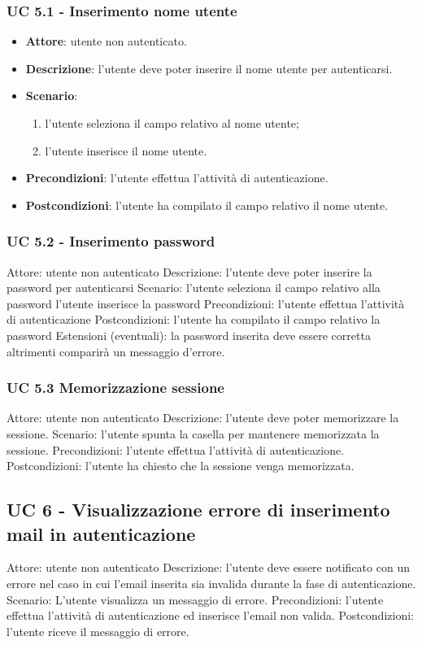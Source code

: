 \subsubsection{UC 5.1 - Inserimento nome utente}
\begin{itemize}
    \item \textbf{Attore}: utente non autenticato.
    \item \textbf{Descrizione}: l’utente deve poter inserire il nome utente per autenticarsi.
    \item \textbf{Scenario}:
    \begin{enumerate}
        \item l’utente seleziona il campo relativo al nome utente;
        \item l’utente inserisce il nome utente.
    \end{enumerate}

    \item \textbf{Precondizioni}: l’utente effettua l’attività di autenticazione.
    \item \textbf{Postcondizioni}: l’utente ha compilato il campo relativo il nome utente.
\end{itemize}

\subsubsection{UC 5.2 - Inserimento password}
Attore: utente non autenticato
Descrizione: l’utente deve poter inserire la password per autenticarsi
Scenario: 
l’utente seleziona il campo relativo alla password
l’utente inserisce la password
Precondizioni: l’utente effettua l’attività di autenticazione
Postcondizioni: l’utente ha compilato il campo relativo la password
Estensioni (eventuali): la password inserita deve essere corretta altrimenti comparirà un messaggio d’errore. 

\subsubsection{UC 5.3 Memorizzazione sessione}
Attore: utente non autenticato
Descrizione: l’utente deve poter memorizzare la sessione.
Scenario: l’utente spunta la casella per mantenere memorizzata la sessione.
Precondizioni: l’utente effettua l’attività di autenticazione.
Postcondizioni: l’utente ha chiesto che la sessione venga memorizzata.


\subsection{UC 6 - Visualizzazione errore di inserimento mail in autenticazione}
Attore: utente non autenticato
Descrizione: l’utente deve essere notificato con un errore nel caso in cui l’email inserita sia invalida durante la fase di autenticazione.
Scenario: L’utente visualizza un messaggio di errore. 
Precondizioni: l’utente effettua l’attività di autenticazione ed inserisce l’email non valida.
Postcondizioni: l’utente riceve il messaggio di errore.

